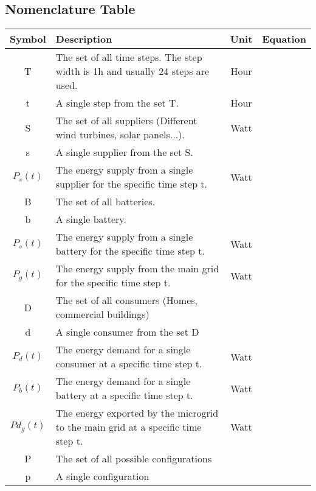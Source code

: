 \subsection{Nomenclature Table}
	\begin{longtable}{|c|p{}|c|c|}
		\toprule
		\textbf{Symbol} & \textbf{Description} & \textbf{Unit} & \textbf{Equation} \\ \midrule
		T & The set of all time steps. The step width is 1h and usually 24 steps are used. & Hour & \Cref{eq1:balance,eq:opt} \\ \midrule
		t & A single step from the set T. & Hour & \Cref{eq1:balance,eq:opt} \\ \midrule
		S & The set of all suppliers (Different wind turbines, solar panels...). & Watt & \Cref{eq1:balance} \\ \midrule
		s & A single supplier from the set S. & & \Cref{eq1:balance} \\ \midrule
		$P_{s}(t)$ & The energy supply from a single supplier for the specific time step t. & Watt & \Cref{eq1:balance} \\ \midrule
		B & The set of all batteries. & & \Cref{eq1:balance} \\ \midrule
		b & A single battery. & & \Cref{eq1:balance} \\ \midrule
		$P_{s}(t)$ & The energy supply from a single battery for the specific time step t. & Watt & \Cref{eq1:balance} \\ \midrule
		$P_{g}(t)$ & The energy supply from the main grid for the specific time step t. & Watt & \Cref{eq1:balance} \\ \midrule
		D & The set of all consumers (Homes, commercial buildings) & & \Cref{eq1:balance} \\ \midrule
		d & A single consumer from the set D & & \Cref{eq1:balance} \\ \midrule
		$P_{d}(t)$ & The energy demand for a single consumer at a specific time step t. & Watt & \Cref{eq1:balance} \\ \midrule
		$P_{b}(t)$ & The energy demand for a single battery at a specific time step t. & Watt & \Cref{eq1:balance} \\ \midrule
		$Pd_{g}(t)$ & The energy exported by the microgrid to the main grid at a specific time step t. & Watt & \Cref{eq1:balance} \\
		P & The set of all possible configurations &  & \Cref{eq:opt} \\ \midrule
		p & A single configuration &  & \Cref{eq:opt} \\ \midrule

\end{longtable}
